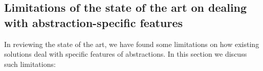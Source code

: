 %
%
%
%
%
%
%

\subsection{Limitations of the state of the art on dealing with abstraction-specific features}

In reviewing the state of the art, we have found some limitations on how existing solutions deal with specific features of abstractions.
In this section we discuss such limitations:


